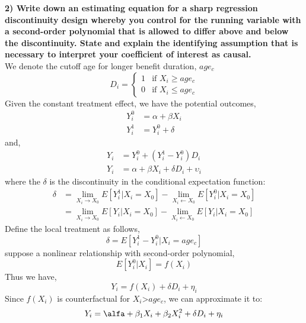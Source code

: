 \documentclass[a4paper,12pt,oneside,English]{article}
\begin{document}
\textbf{2) Write down an estimating equation for a sharp regression discontinuity design whereby you control for the running variable with a second-order polynomial that is allowed to differ above and below the discontinuity. State and explain the identifying assumption that is necessary to interpret your coefficient of interest as causal.}\\
We denote the cutoff age for longer benefit duration, $age_c$
\begin{equation}
    D_i =
    \begin{cases}
    1 & \text{if $X_i \geq age_c$}\\
    0 & \text{if $X_i \leq age_c$}
    \end{cases}
\end{equation}
Given the constant treatment effect, we have the potential outcomes, \begin{align}
    Y_i^0 & = \alpha + \beta X_i \\
    Y_i^1 & = Y_i^0 + \delta
\end{align}
and,
\begin{align}
    Y_i & = Y_i^0 + (Y_i^1 - Y_i^0) D_i \\
    Y_i & = \alpha + \beta X_i + \delta D_i + \upsilon_i
\end{align}
where the $\delta$ is the discontinuity in the conditional expectation function:
\begin{align}
    \delta & = \lim_{X_i \to X_0} E[Y_i^1|X_i = X_0] - \lim_{X_i \gets X_0}E[Y_i^0|X_i = X_0] \\ 
& = \lim_{X_i \to X_0} E[Y_i|X_i = X_0] - \lim_{X_i \gets X_0}E[Y_i|X_i = X_0]
\end{align}
Define the local treatment as follows,
\begin{equation}
    \delta = E[Y_i^1 - Y_i^0 | X_i = age_c]
\end{equation}
suppose a nonlinear relationship with second-order polynomial, 
\begin{equation}
    E[Y_i^0 | X_i] = f(X_i)
\end{equation}
Thus we have, 
\begin{equation}
    Y_i = f(X_i) + \delta D_i + \eta_i
\end{equation}
Since $f(X_{i})$ is counterfactual for $X_{i} $>$ age_c$, we can approximate it to:
\begin{equation}
    Y_i = \alfa + \beta_1 X_i + \beta_2 X_i^2 + \delta D_i + \eta_i
\end{equation}
\end{document}
